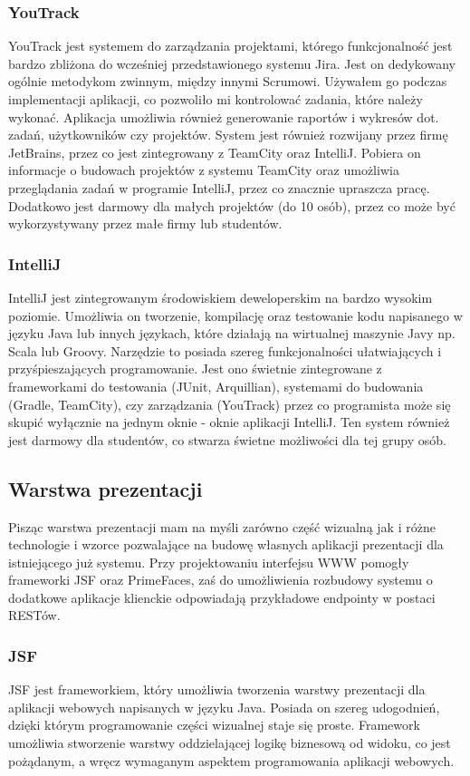 \subsubsection{YouTrack}
YouTrack jest systemem do zarządzania projektami, którego funkcjonalność jest bardzo zbliżona do wcześniej przedstawionego systemu Jira. Jest on dedykowany ogólnie metodykom zwinnym, między innymi Scrumowi. Używałem go podczas implementacji aplikacji, co pozwoliło mi kontrolować zadania, które należy wykonać. Aplikacja umożliwia również generowanie raportów i wykresów dot. zadań, użytkowników czy projektów. System jest również rozwijany przez firmę JetBrains, przez co jest zintegrowany z TeamCity oraz IntelliJ. Pobiera on informacje o budowach projektów z systemu TeamCity oraz umożliwia przeglądania zadań w programie IntelliJ, przez co znacznie upraszcza pracę. Dodatkowo jest darmowy dla małych projektów (do 10 osób), przez co może być wykorzystywany przez małe firmy lub studentów.

\subsubsection{IntelliJ}
IntelliJ jest zintegrowanym środowiskiem deweloperskim na bardzo wysokim poziomie. Umożliwia on tworzenie, kompilację oraz testowanie kodu napisanego w języku Java lub innych językach, które działają na wirtualnej maszynie Javy np. Scala lub Groovy. Narzędzie to posiada szereg funkcjonalności ułatwiających i przyśpieszających programowanie. Jest ono świetnie zintegrowane z frameworkami do testowania (JUnit, Arquillian), systemami do budowania (Gradle, TeamCity), czy zarządzania (YouTrack) przez co programista może się skupić wyłącznie na jednym oknie - oknie aplikacji IntelliJ. Ten system również jest darmowy dla studentów, co stwarza świetne możliwości dla tej grupy osób.


\subsection{Warstwa prezentacji}
Pisząc warstwa prezentacji mam na myśli zarówno część wizualną jak i różne technologie i wzorce pozwalające na budowę własnych aplikacji prezentacji dla istniejącego już systemu. Przy projektowaniu interfejsu WWW pomogły frameworki JSF oraz PrimeFaces, zaś do umożliwienia rozbudowy systemu o dodatkowe aplikacje klienckie odpowiadają przykładowe endpointy w postaci RESTów.

\subsubsection{JSF}
JSF jest frameworkiem, który umożliwia tworzenia warstwy prezentacji dla aplikacji webowych napisanych w języku Java. Posiada on szereg udogodnień, dzięki którym programowanie części wizualnej staje się proste. Framework umożliwia stworzenie warstwy oddzielającej logikę biznesową od widoku, co jest pożądanym, a wręcz wymaganym aspektem programowania aplikacji webowych.

